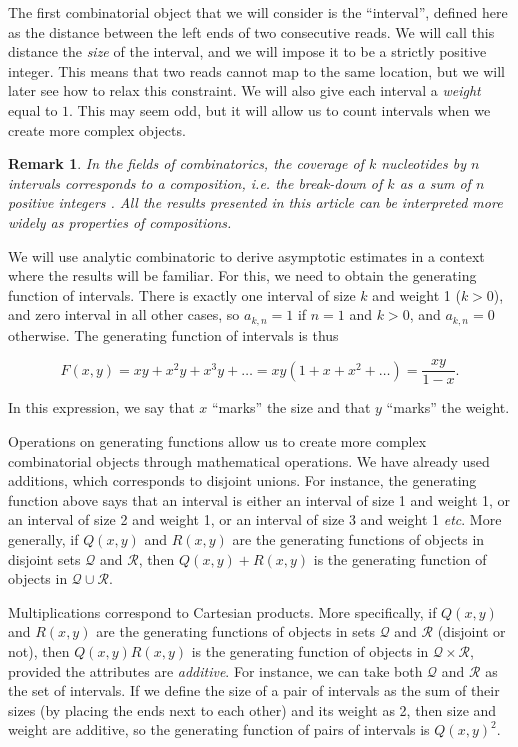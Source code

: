 \documentclass{article}
\newtheorem*{remark}{Remark}
\begin{document}
The first combinatorial object that we will consider is the ``interval'',
defined here as the distance between the left ends of two consecutive
reads. We will call this distance the \emph{size} of the interval, and we
will impose it to be a strictly positive integer. This means that two
reads cannot map to the same location, but we will later see how to relax
this constraint. We will also give each interval a \emph{weight} equal to
$1$. This may seem odd, but it will allow us to count intervals when we
create more complex objects.

\begin{remark}
In the fields of combinatorics, the coverage of $k$ nucleotides by $n$
intervals corresponds to a composition, \textit{i.e.} the break-down of
$k$ as a sum of $n$ positive integers \cite{AnalComb2009}. All the results
presented in this article can be interpreted more widely as properties of
compositions.
\end{remark}

We will use analytic combinatoric to derive asymptotic estimates in a
context where the results will be familiar. For this, we need to obtain
the generating function of intervals. There is exactly one interval of
size $k$ and weight 1 ($k > 0$), and zero interval in all other cases, so
$a_{k,n} = 1$ if $n = 1$ and $k > 0$, and $a_{k,n} = 0$ otherwise. The
generating function of intervals is thus

\begin{equation*}
F(x,y) = xy + x^2y + x^3y + \ldots
= xy(1+x+x^2+\ldots) = \frac{xy}{1-x}.
\end{equation*}

In this expression, we say that $x$ ``marks'' the size and that $y$
``marks'' the weight.

Operations on generating functions allow us to create more complex
combinatorial objects through mathematical operations.  We have already
used additions, which corresponds to disjoint unions. For instance, the
generating function above says that an interval is either an interval of
size 1 and weight 1, or an interval of size 2 and weight 1, or an interval
of size 3 and weight 1 \textit{etc}. More generally, if $Q(x,y)$ and
$R(x,y)$ are the generating functions of objects in disjoint sets
$\mathcal{Q}$ and $\mathcal{R}$, then $Q(x,y)+R(x,y)$ is the generating
function of objects in $\mathcal{Q} \cup \mathcal{R}$.

Multiplications correspond to Cartesian products. More specifically, if
$Q(x,y)$ and $R(x,y)$ are the generating functions of objects in sets
$\mathcal{Q}$ and $\mathcal{R}$ (disjoint or not), then $Q(x,y)R(x,y)$ is
the generating function of objects in $\mathcal{Q} \times \mathcal{R}$,
provided the attributes are \emph{additive}. For instance, we can take
both $\mathcal{Q}$ and $\mathcal{R}$ as the set of intervals. If we define
the size of a pair of intervals as the sum of their sizes (by placing the
ends next to each other) and its weight as 2, then size and weight are
additive, so the generating function of pairs of intervals is $Q(x,y)^2$.
\end{document}
